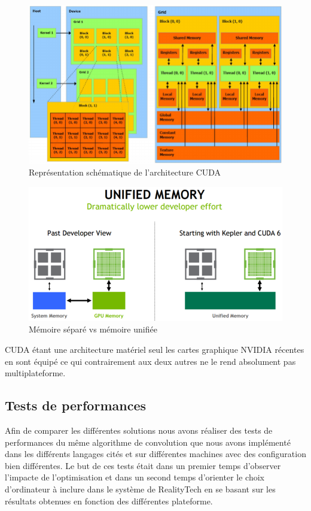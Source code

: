 \begin{figure}[H]
\centering
\includegraphics[width=0.9\linewidth]{images/cuda-archi}
\caption{Représentation schématique de l'architecture CUDA\protect\footnotemark}
\label{fig:cuda:archi}
\end{figure}

\begin{figure}[H]
\centering
\includegraphics[width=0.65\linewidth]{images/cuda-unified-memory}
\caption{Mémoire séparé vs mémoire unifiée\protect\footnotemark}
\label{fig:cuda:unifiedmemory}
\end{figure}

CUDA étant une architecture matériel seul les cartes graphique NVIDIA récentes en sont équipé ce qui contrairement aux deux autres ne le rend absolument pas multiplateforme.

\subsection{Tests de performances}
\label{sub:conv:bench}
Afin de comparer les différentes solutions nous avons réaliser des tests de performances du même algorithme de convolution que nous avons implémenté dans les différents langages cités et sur différentes machines avec des configuration bien différentes. Le but de ces tests était dans un premier temps d'observer l'impacte de l'optimisation et dans un second temps d'orienter le choix d'ordinateur à inclure dans le système de RealityTech en se basant sur les résultats obtenues en fonction des différentes plateforme.

